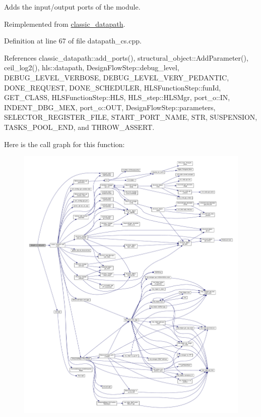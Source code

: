 Adds the input/output ports of the module. 



Reimplemented from \hyperlink{classclassic__datapath_a857c8c07a0bb612dd5e36bba9c48a14d}{classic\+\_\+datapath}.



Definition at line 67 of file datapath\+\_\+cs.\+cpp.



References classic\+\_\+datapath\+::add\+\_\+ports(), structural\+\_\+object\+::\+Add\+Parameter(), ceil\+\_\+log2(), hls\+::datapath, Design\+Flow\+Step\+::debug\+\_\+level, D\+E\+B\+U\+G\+\_\+\+L\+E\+V\+E\+L\+\_\+\+V\+E\+R\+B\+O\+SE, D\+E\+B\+U\+G\+\_\+\+L\+E\+V\+E\+L\+\_\+\+V\+E\+R\+Y\+\_\+\+P\+E\+D\+A\+N\+T\+IC, D\+O\+N\+E\+\_\+\+R\+E\+Q\+U\+E\+ST, D\+O\+N\+E\+\_\+\+S\+C\+H\+E\+D\+U\+L\+ER, H\+L\+S\+Function\+Step\+::fun\+Id, G\+E\+T\+\_\+\+C\+L\+A\+SS, H\+L\+S\+Function\+Step\+::\+H\+LS, H\+L\+S\+\_\+step\+::\+H\+L\+S\+Mgr, port\+\_\+o\+::\+IN, I\+N\+D\+E\+N\+T\+\_\+\+D\+B\+G\+\_\+\+M\+EX, port\+\_\+o\+::\+O\+UT, Design\+Flow\+Step\+::parameters, S\+E\+L\+E\+C\+T\+O\+R\+\_\+\+R\+E\+G\+I\+S\+T\+E\+R\+\_\+\+F\+I\+LE, S\+T\+A\+R\+T\+\_\+\+P\+O\+R\+T\+\_\+\+N\+A\+ME, S\+TR, S\+U\+S\+P\+E\+N\+S\+I\+ON, T\+A\+S\+K\+S\+\_\+\+P\+O\+O\+L\+\_\+\+E\+ND, and T\+H\+R\+O\+W\+\_\+\+A\+S\+S\+E\+RT.

Here is the call graph for this function\+:
\nopagebreak
\begin{figure}[H]
\begin{center}
\leavevmode
\includegraphics[width=350pt]{db/ded/classdatapath__cs_af1a3075eb56ee8636b95a1c4114bbe70_cgraph}
\end{center}
\end{figure}



